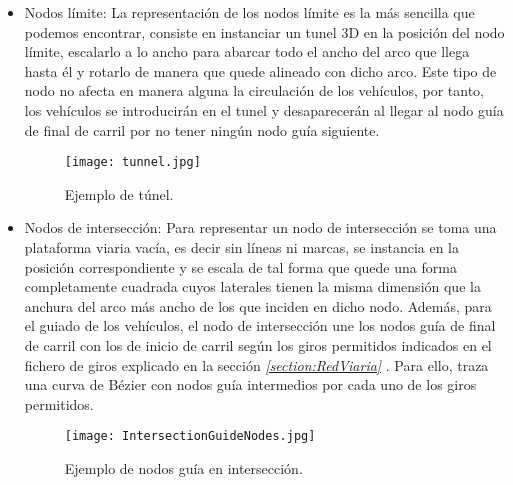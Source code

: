 	\begin{itemize}
	\item Nodos límite:
	\newline
	La representación de los nodos límite es la más sencilla que podemos encontrar, consiste en instanciar un tunel 3D en la posición del nodo límite, escalarlo a lo ancho para abarcar todo el ancho del arco que llega hasta él y rotarlo de manera que quede alineado con dicho arco.
	\newline
	\newline
	Este tipo de nodo no afecta en manera alguna la circulación de los vehículos, por tanto, los vehículos se introducirán en el tunel y desaparecerán al llegar al nodo guía de final de carril por no tener ningún nodo guía siguiente.
	
	\begin{figure}[H]
		\centering
			\texttt{[image: tunnel.jpg]}
	\caption{Ejemplo de túnel.}
	\label{fig:tunnel}
	\end{figure}
	
	\item Nodos de intersección:
	\newline
	Para representar un nodo de intersección se toma una plataforma viaria vacía, es decir sin líneas ni marcas, se instancia en la posición correspondiente y se escala de tal forma que quede una forma completamente cuadrada cuyos laterales tienen la misma dimensión que la anchura del arco más ancho de los que inciden en dicho nodo.
	\newline
	\newline
	Además, para el guiado de los vehículos, el nodo de intersección une los nodos guía de final de carril con los de inicio de carril según los giros permitidos indicados en el fichero de giros explicado en la sección \emph{\ref{section:RedViaria} }. Para ello, traza una curva de Bézier \cite{BezierCurves} con nodos guía intermedios por cada uno de los giros permitidos.
	
	\begin{figure}[H]
		\centering
			\texttt{[image: IntersectionGuideNodes.jpg]}
	\caption{Ejemplo de nodos guía en intersección.}
	\label{fig:IntersectionGuideNodes}
	\end{figure}
	

\end{itemize}
